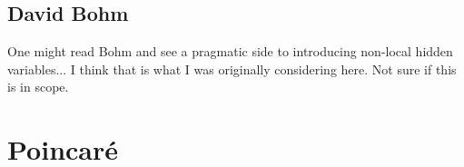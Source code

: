 \subsection{David Bohm}

One might read Bohm and see a pragmatic side to introducing non-local hidden variables... I think that is what I was originally considering here.  Not sure if this is in scope.








\section{Poincar\'e}

